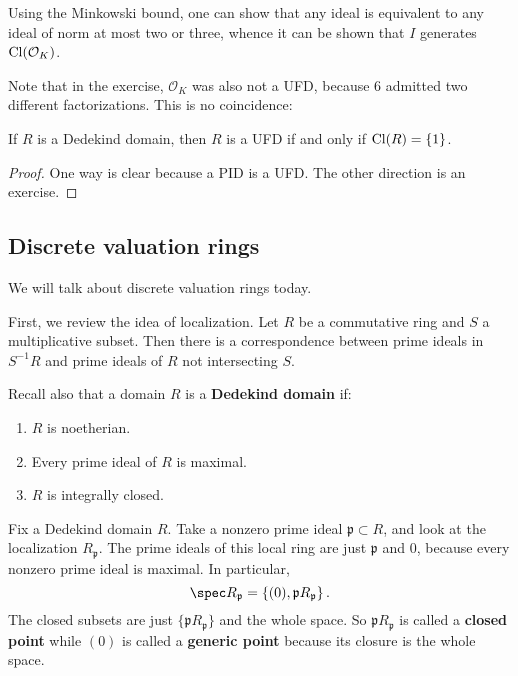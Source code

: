 \begin{example}
\begin{exercise}
Using the Minkowski bound, one can show that any ideal is equivalent to any
ideal of norm at most two or three, whence it can be shown that $I$ generates
$\mathrm{Cl}(\mathcal{O}_K)$.
\end{exercise} 

Note that in the exercise, $\mathcal{O}_K$ was also not a UFD, because 6
admitted two different factorizations. This is no coincidence:

\begin{proposition} 
If $R$ is  a Dedekind domain, then $R$ is a UFD if and only if $\mathrm{Cl}(R) =
\left\{1\right\}$.
\end{proposition} 
\begin{proof} 
One way is clear because a PID is a UFD.  The other direction is an exercise. 
\end{proof} 


\end{example} 


\subsection{Discrete valuation rings}
We will talk about discrete valuation rings today.  

First, we review the idea of localization. Let $R$ be a commutative ring and
$S$ a multiplicative subset. Then there is a correspondence between prime
ideals in $S^{-1}R$ and prime ideals of $R$ not intersecting $S$.

Recall also that a domain $R$ is a \textbf{Dedekind domain} if:
\begin{enumerate}
\item $R$ is noetherian. 
\item Every prime ideal of $R$ is maximal.
\item  $R$ is integrally closed. 
\end{enumerate}

Fix a Dedekind domain $R$.
Take a nonzero prime ideal $\mathfrak{p} \subset R$, and look at the localization
$R_{\mathfrak{p}}$. The prime ideals of this local ring are just $\mathfrak{p}$
and $0$, because every nonzero prime ideal is maximal. In particular,
\[ \spec R_{\mathfrak{p}}  = \left\{(0), \mathfrak{p}R_{\mathfrak{p}}\right\} .\]
The closed subsets are just $\{\mathfrak{p}R_{\mathfrak{p}}\}$ and the whole
space. So $\mathfrak{p}R_{\mathfrak{p}}$ is called a \textbf{closed point}
while $(0)$ is called a \textbf{generic point}  because its closure is the
whole space.  

